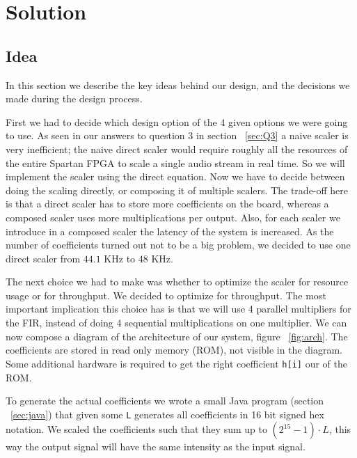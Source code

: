 \section{Solution}
\subsection{Idea}
In this section we describe the key ideas behind our design, and the decisions we made during the design process.

First we had to decide which design option of the 4 given options we were going to use. As seen in our answers to question 3 in section ~\ref{sec:Q3} a naive scaler is very inefficient; the naive direct scaler would require roughly all the resources of the entire Spartan FPGA to scale a single audio stream in real time. So we will implement the scaler using the direct equation. Now we have to decide between doing the scaling directly, or composing it of multiple scalers. The trade-off here is that a direct scaler has to store more coefficients on the board, whereas a composed scaler uses more multiplications per output. Also, for each scaler we introduce in a composed scaler the latency of the system is increased. As the number of coefficients turned out not to be a big problem, we decided to use one direct scaler from $44.1$ KHz to $48$ KHz.

The next choice we had to make was whether to optimize the scaler for resource usage or for throughput. We decided to optimize for throughput. The most important implication this choice has is that we will use 4 parallel multipliers for the FIR, instead of doing 4 sequential multiplications on one multiplier. We can now compose a diagram of the architecture of our system, figure ~\ref{fig:arch}. The coefficients are stored in read only memory (ROM), not visible in the diagram. Some additional hardware is required to get the right coefficient \texttt{h[i]} our of the ROM.

To generate the actual coefficients we wrote a small Java program (section ~\ref{sec:java}) that given some \texttt{L} generates all coefficients  in 16 bit signed hex notation. We scaled the coefficients such that they sum up to $(2^{15}-1)\cdot L$, this way the output signal will have the same intensity as the input signal.

